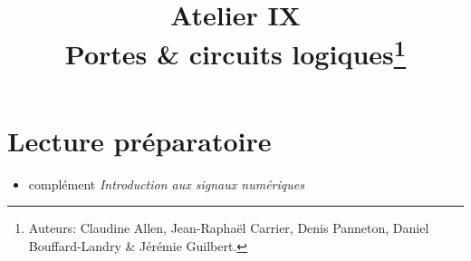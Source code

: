 \documentclass[canadien,12pt,oneside,letterpaper]{article}
\title{\textbf{Atelier IX}\\Portes \& circuits logiques\thanks{Auteurs: Claudine Allen, Jean-Raphaël Carrier, Denis Panneton, Daniel Bouffard-Landry \& Jérémie Guilbert.}}
\date{}
\begin{document}
\maketitle \vspace{-17ex}

%





\section{Lecture préparatoire}
\vspace{-2.5ex}
\begin{itemize}
\item complément \textit{Introduction aux signaux numériques}
\end{itemize}
\end{document}
